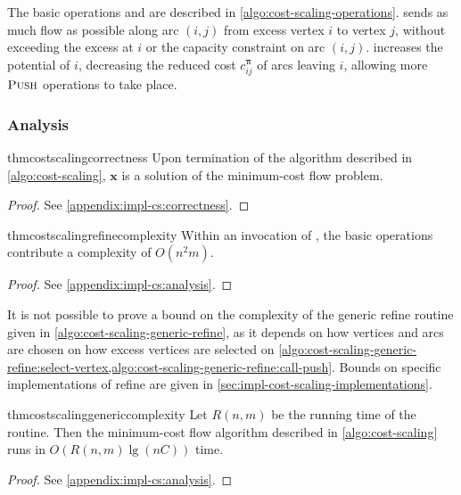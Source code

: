 The basic operations  and  are described in \cref{algo:cost-scaling-operations}.  sends as much flow as possible along arc $(i,j)$ from excess vertex $i$ to vertex $j$, without exceeding the excess at $i$ or the capacity constraint on arc $(i,j)$.  increases the potential of $i$, decreasing the reduced cost $c_{ij}^{\boldsymbol{\pi}}$ of arcs leaving $i$, allowing more $\textproc{Push}$ operations to take place.

\subsubsection{Analysis}

\begin{restatable}{thm}{costscalingcorrectness} \label{thm:cost-scaling-correctness}
    Upon termination of the algorithm described in \cref{algo:cost-scaling}, $\mathbf{x}$ is a solution of the minimum-cost flow problem.  
\end{restatable}
\begin{proof}
See \cref{appendix:impl-cs:correctness}.
\end{proof}

\begin{restatable}{thm}{costscalingrefinecomplexity} \label{thm:cost-scaling-refine-complexity}
Within an invocation of , the basic operations contribute a complexity of $O(n^2m)$.
\end{restatable}
\begin{proof}
See \cref{appendix:impl-cs:analysis}.
\end{proof}

\begin{remark}
It is not possible to prove a bound on the complexity of the generic refine routine given in \cref{algo:cost-scaling-generic-refine}, as it depends on how vertices and arcs are chosen on how excess vertices are selected on \cref{algo:cost-scaling-generic-refine:select-vertex,algo:cost-scaling-generic-refine:call-push}. Bounds on specific implementations of refine are given in \cref{sec:impl-cost-scaling-implementations}.\\
\end{remark}

\begin{restatable}{thm}{costscalinggenericcomplexity} \label{lemma:cost-scaling-overall-algorithm}
Let $R(n,m)$ be the running time of the  routine. Then the minimum-cost flow algorithm described in \cref{algo:cost-scaling} runs in $O\left(R(n,m)\lg(nC)\right)$ time.
\end{restatable}
\begin{proof} 
See \cref{appendix:impl-cs:analysis}.
\end{proof}

